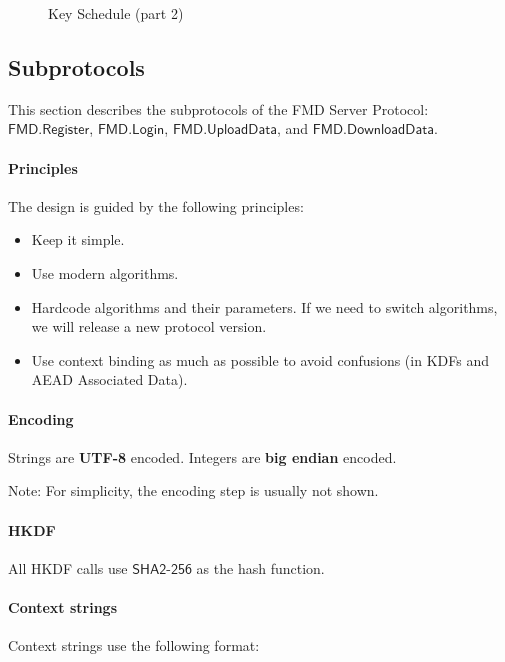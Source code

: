 \documentclass[11pt,a4paper]{article}
\newcommand{\FMDRegister}{\mathsf{FMD.Register}}
\newcommand{\FMDLogin}{\mathsf{FMD.Login}}
\newcommand{\FMDUploadData}{\mathsf{FMD.UploadData}}
\newcommand{\FMDDownloadData}{\mathsf{FMD.DownloadData}}
\newcommand{\SHATwoFiveSix}{\mathsf{SHA2\text{-}256}}
\begin{document}
\begin{landscape}
\begin{figure}
\begin{center}
\begin{tikzpicture}[thick]
        \end{tikzpicture}
    \end{center}

    \caption{Key Schedule (part 2)}
    \label{fig:key-schedule-data} %
\end{figure}


\end{landscape}




\subsection{Subprotocols}\label{sec:subprotocols}

This section describes the subprotocols of the FMD Server Protocol:
$\FMDRegister$, $\FMDLogin$, $\FMDUploadData$, and $\FMDDownloadData$.

\paragraph{Principles}
The design is guided by the following principles:

\begin{itemize}
    \item Keep it simple.
    \item Use modern algorithms.
    \item Hardcode algorithms and their parameters.
        If we need to switch algorithms, we will release a new protocol version.
    \item Use context binding as much as possible to avoid confusions (in KDFs and AEAD Associated Data).
\end{itemize}

\paragraph{Encoding}
Strings are \textbf{UTF-8} encoded.
Integers are \textbf{big endian} encoded.

Note: For simplicity, the encoding step is usually not shown.

\paragraph{HKDF}
All HKDF calls use $\SHATwoFiveSix$ as the hash function.

\paragraph{Context strings}
Context strings use the following format:
\end{document}
